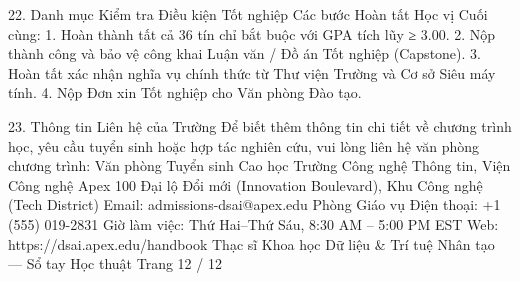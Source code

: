 22. Danh mục Kiểm tra Điều kiện Tốt nghiệp
Các bước Hoàn tất Học vị Cuối cùng:
1. Hoàn thành tất cả 36 tín chỉ bắt buộc với GPA tích lũy ≥ 3.00.
2. Nộp thành công và bảo vệ công khai Luận văn / Đồ án Tốt nghiệp (Capstone).
3. Hoàn tất xác nhận nghĩa vụ chính thức từ Thư viện Trường và Cơ sở Siêu máy tính.
4. Nộp Đơn xin Tốt nghiệp cho Văn phòng Đào tạo.

23. Thông tin Liên hệ của Trường
Để biết thêm thông tin chi tiết về chương trình học, yêu cầu tuyển sinh hoặc hợp tác nghiên cứu, vui lòng liên hệ văn phòng chương trình:
Văn phòng Tuyển sinh Cao học
Trường Công nghệ Thông tin, Viện Công nghệ Apex
100 Đại lộ Đổi mới (Innovation Boulevard), Khu Công nghệ (Tech District)
Email: admissions-dsai@apex.edu
Phòng Giáo vụ
Điện thoại: +1 (555) 019-2831
Giờ làm việc: Thứ Hai–Thứ Sáu, 8:30 AM – 5:00 PM EST
Web: https://dsai.apex.edu/handbook
Thạc sĩ Khoa học Dữ liệu \& Trí tuệ Nhân tạo — Sổ tay Học thuật
Trang 12 / 12
